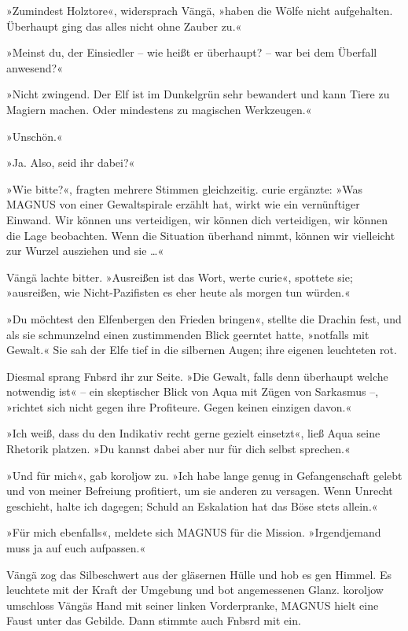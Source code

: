 »Zumindest Holztore«, widersprach Vängä, »haben die Wölfe nicht aufgehalten. Überhaupt ging das alles nicht ohne Zauber zu.«

»Meinst du, der Einsiedler – wie heißt er überhaupt? – war bei dem Überfall anwesend?«

»Nicht zwingend. Der Elf ist im Dunkelgrün sehr bewandert und kann Tiere zu Magiern machen. Oder mindestens zu magischen Werkzeugen.«

»Unschön.«

»Ja. Also, seid ihr dabei?«

»Wie bitte?«, fragten mehrere Stimmen gleichzeitig. curie ergänzte: »Was MAGNUS von einer Gewaltspirale erzählt hat, wirkt wie ein vernünftiger Einwand. Wir können uns verteidigen, wir können dich verteidigen, wir können die Lage beobachten. Wenn die Situation überhand nimmt, können wir vielleicht zur Wurzel ausziehen und sie …«

Vängä lachte bitter. »Ausreißen ist das Wort, werte curie«, spottete sie; »ausreißen, wie Nicht-Pazifisten es eher heute als morgen tun würden.«

»Du möchtest den Elfenbergen den Frieden bringen«, stellte die Drachin fest, und als sie schmunzelnd einen zustimmenden Blick geerntet hatte, »notfalls mit Gewalt.« Sie sah der Elfe tief in die silbernen Augen; ihre eigenen leuchteten rot.

Diesmal sprang Fnbsrd ihr zur Seite. »Die Gewalt, falls denn überhaupt welche notwendig ist« – ein skeptischer Blick von Aqua mit Zügen von Sarkasmus –, »richtet sich nicht gegen ihre Profiteure. Gegen keinen einzigen davon.«

»Ich weiß, dass du den Indikativ recht gerne gezielt einsetzt«, ließ Aqua seine Rhetorik platzen. »Du kannst dabei aber nur für dich selbst sprechen.«

»Und für mich«, gab koroljow zu. »Ich habe lange genug in Gefangenschaft gelebt und von meiner Befreiung profitiert, um sie anderen zu versagen. Wenn Unrecht geschieht, halte ich dagegen; Schuld an Eskalation hat das Böse stets allein.«

»Für mich ebenfalls«, meldete sich MAGNUS für die Mission. »Irgendjemand muss ja auf euch aufpassen.«

Vängä zog das Silbeschwert aus der gläsernen Hülle und hob es gen Himmel. Es leuchtete mit der Kraft der Umgebung und bot angemessenen Glanz. koroljow umschloss Vängäs Hand mit seiner linken Vorderpranke, MAGNUS hielt eine Faust unter das Gebilde. Dann stimmte auch Fnbsrd mit ein.

